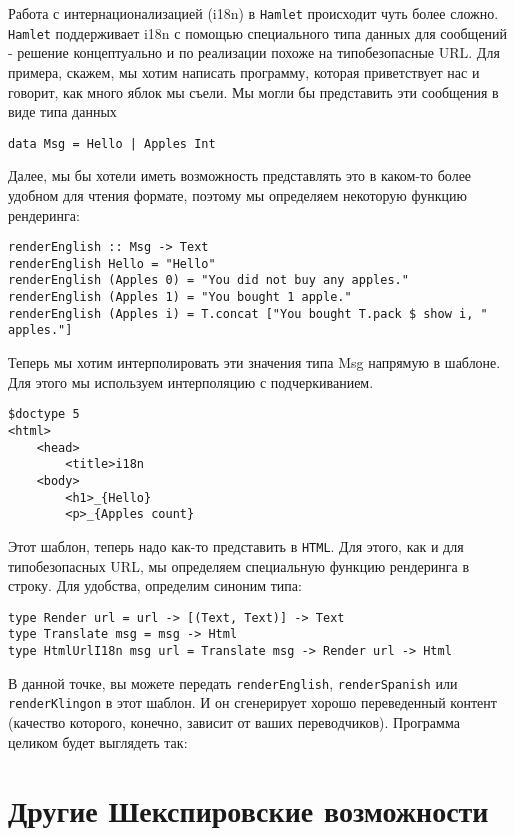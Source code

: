 Работа с интернационализацией (i18n) в \texttt{Hamlet} происходит чуть более сложно.
\texttt{Hamlet} поддерживает i18n с помощью специального типа данных для сообщений - решение
концептуально и по реализации похоже на типобезопасные URL. Для примера, скажем,
мы хотим написать программу, которая приветствует нас и говорит, как много яблок
мы съели. Мы могли бы представить эти сообщения в виде типа данных

\begin{lstlisting}
data Msg = Hello | Apples Int
\end{lstlisting}

Далее, мы бы хотели иметь возможность представлять это в каком-то более удобном
для чтения формате, поэтому мы определяем некоторую функцию рендеринга:
\begin{lstlisting}
renderEnglish :: Msg -> Text
renderEnglish Hello = "Hello"
renderEnglish (Apples 0) = "You did not buy any apples."
renderEnglish (Apples 1) = "You bought 1 apple."
renderEnglish (Apples i) = T.concat ["You bought T.pack $ show i, " apples."]
\end{lstlisting}

Теперь мы хотим интерполировать эти значения типа Msg напрямую в шаблоне.
Для этого мы используем интерполяцию с подчеркиванием.

\begin{lstlisting}
$doctype 5
<html>
    <head>
        <title>i18n
    <body>
        <h1>_{Hello}
        <p>_{Apples count}
\end{lstlisting}

Этот шаблон, теперь надо как-то представить в \texttt{HTML}.  Для этого, как и для типобезопасных URL,
мы определяем специальную функцию рендеринга в строку.
Для удобства, определим синоним типа:

\begin{lstlisting}
type Render url = url -> [(Text, Text)] -> Text
type Translate msg = msg -> Html
type HtmlUrlI18n msg url = Translate msg -> Render url -> Html
\end{lstlisting}

В данной точке, вы можете передать \lstinline!renderEnglish!,
\lstinline!renderSpanish! или \lstinline!renderKlingon! в этот шаблон. И он
сгенерирует хорошо переведенный контент (качество которого, конечно, зависит от
ваших переводчиков). Программа целиком будет выглядеть так:

\section{Другие Шекспировские возможности}

